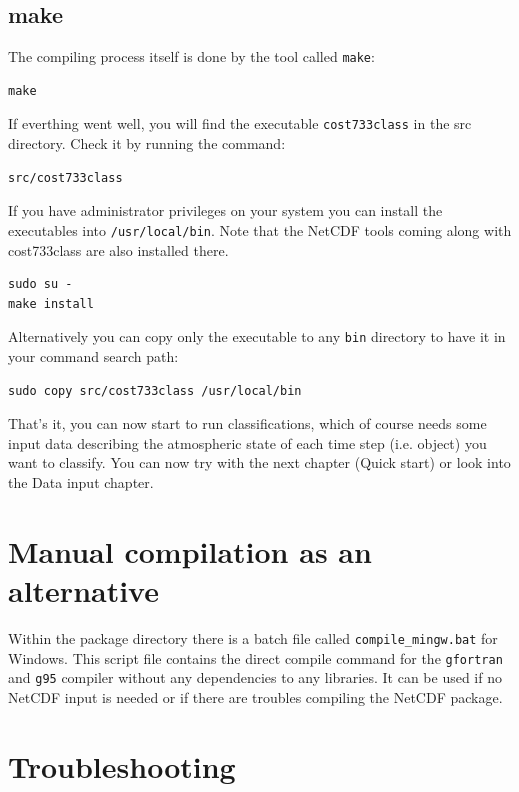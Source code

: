 \documentclass[12pt, oneside, a4paper, headsepline, plainheadsepline]{scrbook}
\begin{document}
\subsection{make}

The compiling process itself is done by the tool called \verb+make+:
\begin{lstlisting}
make
\end{lstlisting}

If everthing went well, you will find the executable \verb+cost733class+ in the src directory.
Check it by running the command:
\begin{lstlisting}
src/cost733class
\end{lstlisting}


If you have administrator privileges on your system you can install the executables into \verb+/usr/local/bin+.
Note that the NetCDF tools coming along with cost733class are also installed there.
\begin{lstlisting}
sudo su -
make install
\end{lstlisting}
Alternatively you can copy only the executable to any \verb+bin+ directory to have it in your
command search path:
\begin{lstlisting}
sudo copy src/cost733class /usr/local/bin
\end{lstlisting}

That's it, you can now start to run classifications, which of course needs some input data 
describing the atmospheric state of each time step (i.e. object) you want to classify. 
You can now try with the next chapter (Quick start) or look into the Data input chapter.


\section{Manual compilation as an alternative}

Within the package directory there is a batch file called
\verb+compile_mingw.bat+ for Windows. This script file contains
the direct compile command for the \verb+gfortran+ and \verb+g95+ compiler without any 
dependencies to any libraries.
It can be used if no NetCDF input is needed or if there are troubles compiling
the NetCDF package.

\section{Troubleshooting}
\end{document}
